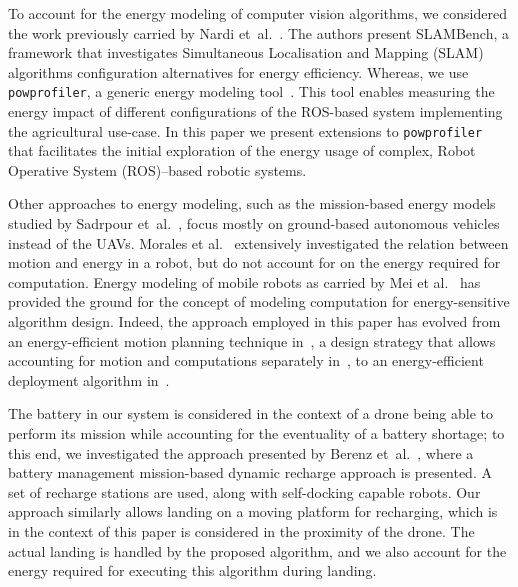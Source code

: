 \documentclass[conference]{IEEEtran}
\newcommand{\stt}[1]{{\small\tt #1}} %
\newcommand{\powprof}{\stt{powprofiler}}
\begin{document}
%
To account for the energy modeling of computer vision algorithms, we
considered the work previously carried by Nardi
et~al.~\cite{nardi2015introducing}. The authors present SLAMBench, a
framework that investigates Simultaneous Localisation and Mapping (SLAM) algorithms configuration alternatives
for energy efficiency. Whereas, we use \powprof{}, a generic energy
modeling tool~\cite{seewald2019coarse}. This tool enables measuring
the energy impact of different configurations of the ROS-based system
implementing the agricultural use-case. In this paper we present
extensions to \powprof{} that facilitates the initial exploration of
the energy usage of complex, Robot Operative System (ROS)--based robotic systems.

Other approaches to energy modeling, such as the mission-based energy
models studied by Sadrpour et~al.~\cite{sadrpour2013experimental,
  sadrpour2013mission}, focus mostly on ground-based autonomous
vehicles instead of the UAVs. Morales et al.~\cite{morales2009power}
extensively investigated the relation between motion and energy in a
robot, but do not account for on the energy required for computation.
%
Energy modeling of mobile robots as carried by Mei et
al.~\cite{mei2006deployment, mei2005case, mei2004energy} has provided
the ground for the concept of modeling computation for
energy-sensitive algorithm design. Indeed, the approach employed in this paper has evolved
from an energy-efficient motion planning technique
in~\cite{mei2004energy}, a design strategy that allows accounting for
motion and computations separately in~\cite{mei2005case}, to an
energy-efficient deployment algorithm in~\cite{mei2006deployment}.

The battery in our system is considered in the context of a drone
being able to perform its mission while accounting for the eventuality
of a battery shortage; to this end, we investigated the approach
presented by Berenz et~al.~\cite{berenz2012autonomous}, where a
battery management mission-based dynamic recharge approach is
presented. A set of recharge stations are used, along with
self-docking capable robots. Our approach similarly allows landing on
a moving platform for recharging, which is in the context of this
paper is considered in the proximity of the drone. The actual landing
is handled by the proposed algorithm, and we also account for the
energy required for executing this algorithm during landing.
%
\end{document}
